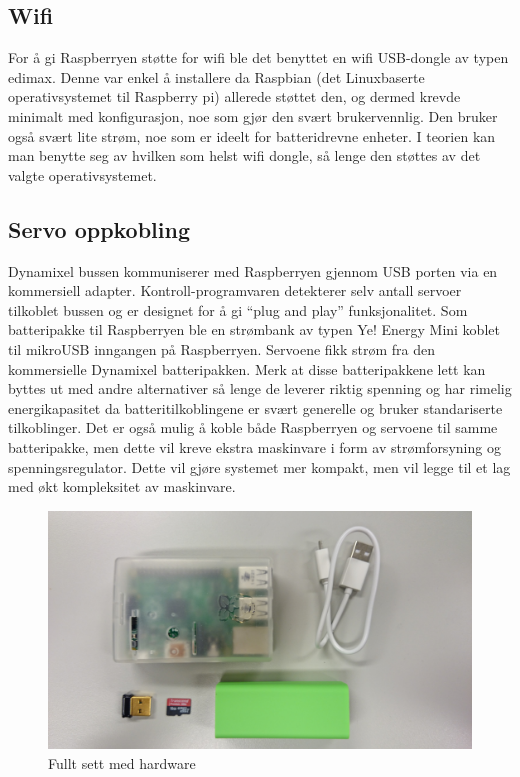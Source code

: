 \documentclass[12pt]{report}
\begin{document}
\subsection{Wifi}
For å gi Raspberryen støtte for wifi ble det benyttet en wifi USB-dongle av typen edimax\cite{dongle}. Denne var enkel å installere da Raspbian (det Linuxbaserte operativsystemet til Raspberry pi) allerede støttet den, og dermed krevde minimalt med konfigurasjon, noe som gjør den svært brukervennlig. Den bruker også svært lite strøm, noe som er ideelt for batteridrevne enheter. I teorien kan man benytte seg av hvilken som helst wifi dongle, så lenge den støttes av det valgte operativsystemet.

\subsection{Servo oppkobling}
Dynamixel bussen kommuniserer med Raspberryen gjennom USB porten via en kommersiell adapter\cite{USBadapter}. Kontroll-programvaren detekterer selv antall servoer tilkoblet bussen og er designet for å gi “plug and play” funksjonalitet. Som batteripakke til Raspberryen ble en strømbank av typen Ye! Energy Mini\cite{Energybank} koblet til mikroUSB inngangen på Raspberryen. Servoene fikk strøm fra den kommersielle Dynamixel batteripakken. Merk at disse batteripakkene lett kan byttes ut med andre alternativer så lenge de leverer riktig spenning og har rimelig energikapasitet da batteritilkoblingene er svært generelle og bruker standariserte tilkoblinger. Det er også mulig å koble både Raspberryen og servoene til samme batteripakke, men dette vil kreve ekstra maskinvare i form av strømforsyning og spenningsregulator. Dette vil gjøre systemet mer kompakt, men vil legge til et lag med økt kompleksitet av maskinvare.

\begin{figure}[H]
	\includegraphics[scale=0.07]{imgs/full_set}
	\centering
	\caption{Fullt sett med hardware}
	\label{fllsett}
\end{figure}
\end{document}
